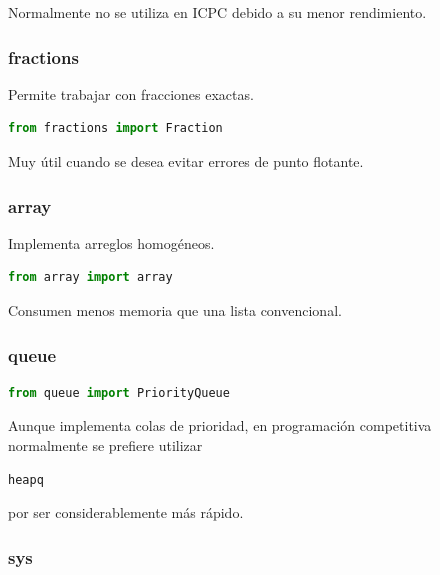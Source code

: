 Normalmente no se utiliza en ICPC debido a su menor rendimiento.

\vspace{0.3cm}

\subsubsection{fractions}

Permite trabajar con fracciones exactas.

\begin{lstlisting}[language=Python]
from fractions import Fraction
\end{lstlisting}

Muy útil cuando se desea evitar errores de punto flotante.

\vspace{0.3cm}

\subsubsection{array}

Implementa arreglos homogéneos.

\begin{lstlisting}[language=Python]
from array import array
\end{lstlisting}

Consumen menos memoria que una lista convencional.

\vspace{0.3cm}

\subsubsection{queue}

\begin{lstlisting}[language=Python]
from queue import PriorityQueue
\end{lstlisting}

Aunque implementa colas de prioridad, en programación competitiva normalmente se prefiere utilizar

\begin{lstlisting}[language=Python]
heapq
\end{lstlisting}

por ser considerablemente más rápido.

\vspace{0.3cm}

\subsubsection{sys}
\label{sub:sys}

